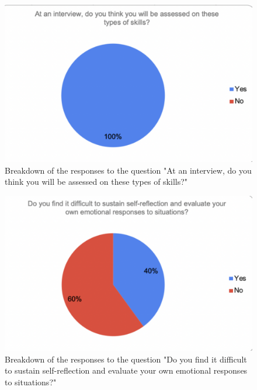 \documentclass{l4proj}
\begin{document}
\begin{appendices}
\begin{figure}[H]
    \begin{centering}
    \includegraphics[scale=0.5]{images/GradAttr-7.pdf}
    \caption{Breakdown of the responses to the question "At an interview, do you think you will be assessed on these types of skills?"}
    \label{fig: GradAttr-7}
    \end{centering}
\end{figure}

\begin{figure}[H]
    \begin{centering}
    \includegraphics[scale=0.5]{images/GradAttr-8.pdf}
    \caption{Breakdown of the responses to the question "Do you find it difficult to sustain self-reflection and evaluate your own emotional responses to situations?"}
    \label{fig: GradAttr-8}
    \end{centering}
\end{figure}


\end{appendices}
\end{document}
